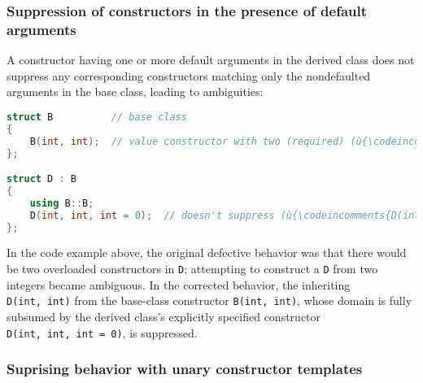 \subsubsection[Suppression of constructors in the presence of default arguments]{Suppression of constructors in the presence of default arguments}

A constructor having one or more default arguments in the derived class does not suppress any corresponding constructors matching only the nondefaulted arguments in the base class, leading to ambiguities:
\begin{lstlisting}[language=C++]
struct B          // base class
{
    B(int, int);  // value constructor with two (required) (ù{\codeincomments{int}}ù) parameters
};

struct D : B
{
    using B::B;
    D(int, int, int = 0);  // doesn't suppress (ù{\codeincomments{D(int, int)}}ù) from (ù{\codeincomments{B(int, int)}}ù)
};
\end{lstlisting}
    In the code example above, the original defective behavior was that there would be two overloaded constructors in \texttt{D}; attempting to construct a \texttt{D} from two integers became ambiguous. In the corrected behavior, the inheriting \texttt{D(int,}~\texttt{int)} from the base-class constructor \texttt{B(int,}~\texttt{int)}, whose domain is fully subsumed by the derived class’s explicitly specified constructor \texttt{D(int,}~\texttt{int,}~\texttt{int}~\texttt{=}~\texttt{0)}, is suppressed.

\subsubsection[Suprising behavior with unary constructor templates]{Suprising behavior with unary constructor templates}

